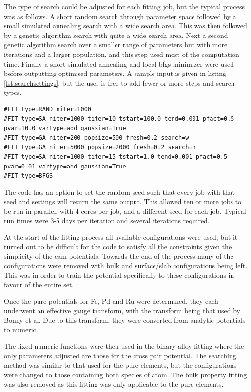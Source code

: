 The type of search could be adjusted for each fitting job, but the typical process was as follows.  A short random search through parameter space followed by a small simulated annealing search with a wide search area.  This was then followed by a genetic algorithm search with quite a wide search area.  Next a second genetic algorithm search over a smaller range of parameters but with more iterations and a larger population, and this step used most of the computation time.  Finally a short simulated annealing and local \acrshort{bfgs} minimizer were used before outputting optimised parameters.  A sample input is given in listing \ref{lst:searchsettings}, but the user is free to add fewer or more steps and search types.

\begin{lstlisting}[style=sEmail,caption={Parameter search settings when fitting in EAMPA}, label={lst:searchsettings}]
#FIT type=RAND niter=1000 
#FIT type=SA niter=1000 titer=10 tstart=100.0 tend=0.001 pfact=0.5 pvar=10.0 vartype=add gaussian=True
#FIT type=GA niter=200 popsize=500 fresh=0.2 search=w
#FIT type=GA niter=5000 popsize=2000 fresh=0.2 search=n
#FIT type=SA niter=1000 titer=15 tstart=1.0 tend=0.001 pfact=0.5 pvar=0.01 vartype=add gaussian=True
#FIT type=BFGS
\end{lstlisting}

The code has an option to set the random seed such that every job with that seed and settings will return the same output.  This allowed ten or more jobs to be run in parallel, with 4 cores per job, and a different seed for each job.  Typical run times were 3-5 days per iteration and several iterations required.

At the start of the fitting process all available configurations were used, but it turned out to be difficult for the code to satisfy all the constraints given the simplicity of the \acrshort{eam} potentials.  Towards the end of the process many of the configurations were removed with bulk and surface/slab configurations being left.  This was in order to train the potential specifically to these configurations in favour of the entire set.  

Once the pure potentials for Fe, Pd and Ru were determined, they each underwent an effective gauge transform, with the transform being that used by Bonny et al\cite{bonnyfecr}\cite{bonnymalerba}.  Due to this transform, they were converted from analytic potentials to numeric.  

The fixed numeric functions were then used in the binary alloy fitting where the only parameters adjusted are those for the cross pair potential.  The searching method was similar to that used for the pure elements, but the configurations were changed to those containing both species of atom.  The bulk property fitting was also removed as this fitting was only applicable to the pure elements.















